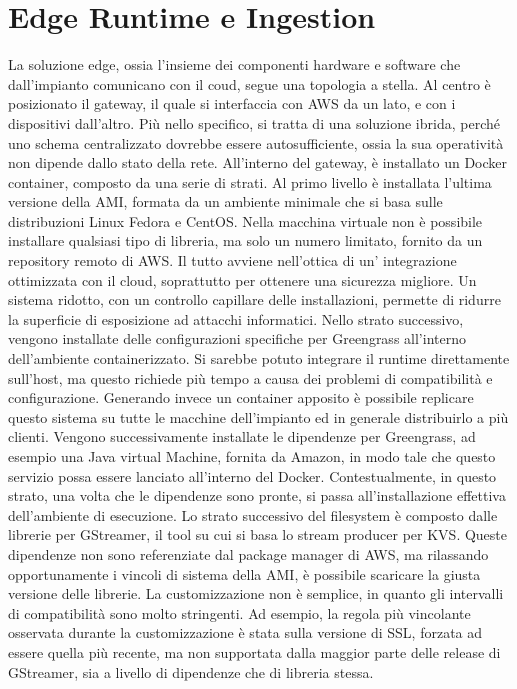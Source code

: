 \newpage
\section{Edge Runtime e Ingestion}

La soluzione edge, ossia l'insieme dei componenti hardware e software che dall'impianto comunicano con il coud, segue una topologia a stella. Al centro è posizionato il gateway, il quale si interfaccia con AWS da un lato, e con i dispositivi dall'altro. Più nello specifico, si tratta di una soluzione ibrida, perché uno schema centralizzato dovrebbe essere autosufficiente, ossia la sua operatività non dipende dallo stato della rete. All'interno del gateway, è installato un Docker container, composto da una serie di strati. Al primo livello è installata l'ultima versione della AMI, formata da un ambiente minimale che si basa sulle distribuzioni Linux Fedora e CentOS. Nella macchina virtuale non è possibile installare qualsiasi tipo di libreria, ma solo un numero limitato, fornito da un repository remoto di AWS. Il tutto avviene nell'ottica di un' integrazione ottimizzata con il cloud, soprattutto per ottenere una sicurezza migliore. Un sistema ridotto, con un controllo capillare delle installazioni, permette di ridurre la superficie di esposizione ad attacchi informatici. Nello strato successivo, vengono installate delle configurazioni specifiche per Greengrass all'interno dell'ambiente containerizzato. Si sarebbe potuto integrare il runtime direttamente sull'host, ma questo richiede più tempo a causa dei problemi di compatibilità e configurazione. Generando invece un container apposito è possibile replicare questo sistema su tutte le macchine dell'impianto ed in generale distribuirlo a più clienti. Vengono successivamente installate le dipendenze per Greengrass, ad esempio una Java virtual Machine, fornita da Amazon, in modo tale che questo servizio possa essere lanciato all'interno del Docker. Contestualmente, in questo strato, una volta che le dipendenze sono pronte, si passa all'installazione effettiva dell'ambiente di esecuzione. Lo strato successivo del filesystem è composto dalle librerie per GStreamer, il tool su cui si basa lo stream producer per KVS. Queste dipendenze non sono referenziate dal package manager di AWS, ma rilassando opportunamente i vincoli di sistema della AMI, è possibile scaricare la giusta versione delle librerie. La customizzazione non è semplice, in quanto gli intervalli di compatibilità sono molto stringenti. Ad esempio, la regola più vincolante osservata durante la customizzazione è stata sulla versione di SSL, forzata ad essere quella più recente, ma non supportata dalla maggior parte delle release di GStreamer, sia a livello di dipendenze che di libreria stessa.







